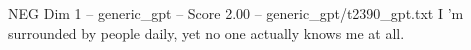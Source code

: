 \begin{textsample}{NEG Dim 1 – generic\_gpt – Score 2.00 – generic\_gpt/t2390\_gpt.txt}  \label{ex:f1_neg_037}
I ’m surrounded by people daily, yet no one actually knows me at all.

\end{textsample}
